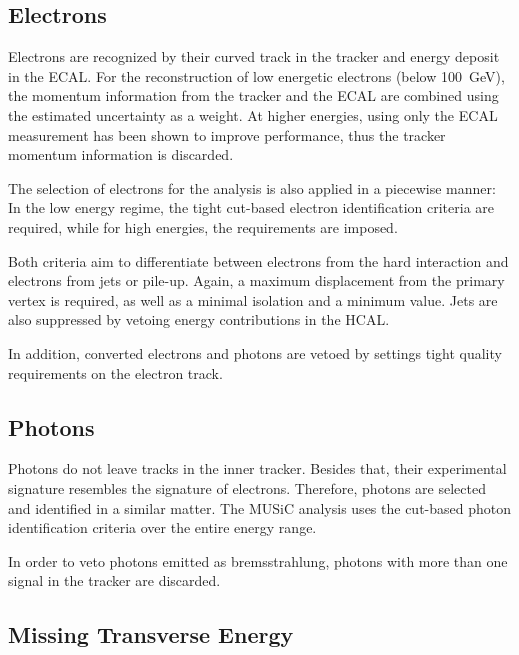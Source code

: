 \subsection{Electrons}
Electrons are recognized by their curved track in the tracker and energy deposit in the \ac{ECAL}. For the reconstruction of low energetic electrons (below \SI{100}{\GeV}), the momentum information from the tracker and the \ac{ECAL} are combined using the estimated uncertainty as a weight. At higher energies, using only the \ac{ECAL} measurement has been shown to improve performance, thus the tracker momentum information is discarded.

The selection of electrons for the analysis is also applied in a piecewise manner: In the low energy regime, the tight cut-based electron identification criteria are required, while for high energies, the  requirements\cite{TWiki:HEEP} are imposed. 

Both criteria aim to differentiate between electrons from the hard interaction and electrons from jets or pile-up. Again, a maximum displacement from the primary vertex is required, as well as a minimal isolation and a minimum \pT value. Jets are also suppressed by vetoing energy contributions in the \ac{HCAL}.

In addition, converted electrons and photons are vetoed by settings tight quality requirements on the electron track.

\subsection{Photons}
Photons do not leave tracks in the inner tracker. Besides that, their experimental signature resembles the signature of electrons. 
Therefore, photons are selected and identified in a similar matter. The \ac{MUSiC} analysis uses the cut-based photon identification criteria\cite{TWiki:PhotonID} over the entire energy range. 

In order to veto photons emitted as bremsstrahlung, photons with more than one signal in the tracker are discarded.

\subsection{Missing Transverse Energy}
\label{sec:met_definition}

